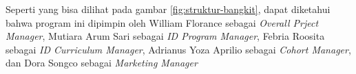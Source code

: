 Seperti yang bisa dilihat pada gambar \ref{fig:struktur-bangkit}, dapat diketahui bahwa program ini dipimpin oleh William Florance sebagai \textit{Overall Prject Manager}, Mutiara Arum Sari sebagai \textit{ID Program Manager}, Febria Roosita sebagai \textit{ID Curriculum Manager}, Adrianus Yoza Aprilio sebagai \textit{Cohort Manager}, dan Dora Songco sebagai \textit{Marketing Manager}